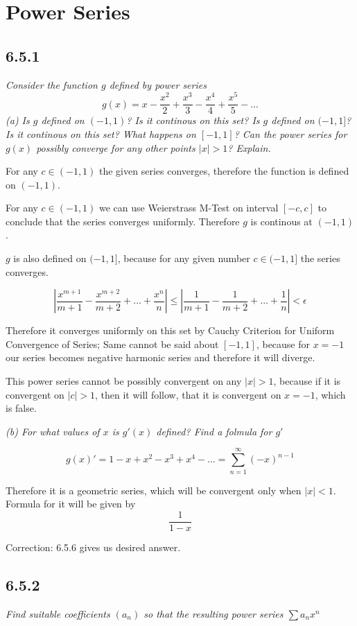\documentclass[11pt,oneside,titlepage]{book}
\begin{document}
\section{Power Series}

\subsection*{6.5.1}
\textit{Consider the function $g$ defined by power series }
$$g(x) = x - \frac{x^2}{2} + \frac{x^3}{3} - \frac{x^4}{4} +
\frac{x^5}{5} - ... $$
\textit{(a) Is $g$ defined on $(-1, 1)$? Is it continous on this set? Is $g$
  defined on $(-1, 1]$? Is it continous on this set? What happens on $[-1, 1]$?
  Can the power series for $g(x)$ possibly converge for any other points
  $|x| > 1$? Explain.}

For any $c \in (-1, 1)$ the given series converges, therefore the function is
defined on $(-1, 1)$.

For any $c \in (-1, 1)$ we can use Weierstrass M-Test on interval $[-c, c]$
to conclude that the series converges uniformly. Therefore $g$ is continous
at $(-1, 1)$.

$g$ is also defined on $(-1, 1]$, because for any given number $c \in (-1, 1]$
the series converges.

$$\left|\frac{x^{m + 1}}{m + 1} - \frac{x^{m + 2}}{m + 2} + ...
  + \frac{x^{n}}{n}\right| \leq
\left|\frac{1}{m + 1} - \frac{1}{m + 2} + ...
+ \frac{1}{n}\right| < \epsilon$$

Therefore it converges uniformly on this set by Cauchy Criterion
for Uniform Convergence of Series;
Same cannot be said about $[-1, 1]$, because for
$x = -1$ our series becomes negative harmonic series and therefore it will
diverge.

This power series cannot be possibly convergent on any $|x| > 1$, because
if it is convergent on $|c| > 1$, then it will follow, that it is
convergent on $x = -1$, which is false.

\textit{(b) For what values of $x$ is $g'(x)$ defined? Find a folmula
  for $g'$}

$$g(x)' = 1 - x + x^2 - x^3 + x^4  - ...  = \sum_{n = 1}^{\infty}(-x)^{n - 1}$$

Therefore it is a geometric series, which will be convergent only when
$|x| < 1$.  Formula for it will be given by
$$\frac{1}{1 - x}$$

Correction: 6.5.6 gives us desired answer.

\subsection*{6.5.2}
\textit{Find suitable coefficients $(a_n)$ so that the resulting power series
  $\sum a_n x^n$}
\end{document}

